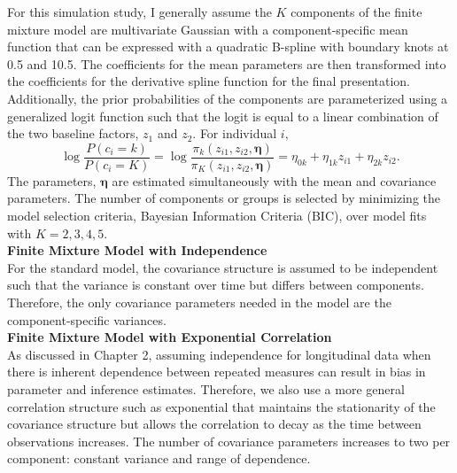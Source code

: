 \documentclass[12pt]{article}
\newcommand{\bs}[0]{\boldsymbol}
\begin{document}
For this simulation study, I generally assume the $K$ components of the finite mixture model are multivariate Gaussian with a component-specific mean function that can be expressed with a quadratic B-spline with boundary knots at 0.5 and 10.5. The coefficients for the mean parameters are then transformed into the coefficients for the derivative spline function for the final presentation. Additionally, the prior probabilities of the components are parameterized using a generalized logit function such that the logit is equal to a linear combination of the two baseline factors, $z_{1}$ and $z_{2}$. For individual $i$, 
$$\log\frac{P(c_{i}=k)}{P(c_{i}=K)} = \log\frac{\pi_{k}(z_{i1},z_{i2},\bs\eta)}{\pi_{K}(z_{i1},z_{i2},\bs\eta)} =  \eta_{0k}+\eta_{1k}z_{i1}+\eta_{2k}z_{i2}.$$
The parameters, $\bs\eta$ are estimated simultaneously with the mean and covariance parameters. 
The number of components or groups is selected by minimizing the model selection criteria, Bayesian Information Criteria (BIC), over model fits with $K=2,3,4,5$. \\ 

\textbf{Finite Mixture Model with Independence}\\
For the standard model, the covariance structure is assumed to be independent such that the variance is constant over time but differs between components. Therefore, the only covariance parameters needed in the model are the component-specific variances.\\

\textbf{Finite Mixture Model with Exponential Correlation}\\
As discussed in Chapter 2, assuming independence for longitudinal data when there is inherent dependence between repeated measures can result in bias in parameter and inference estimates. Therefore, we also use a more general correlation structure such as exponential that maintains the stationarity of the covariance structure but allows the correlation to decay as the time between observations increases. The number of covariance parameters increases to two per component: constant variance and range of dependence. \\
\end{document}
